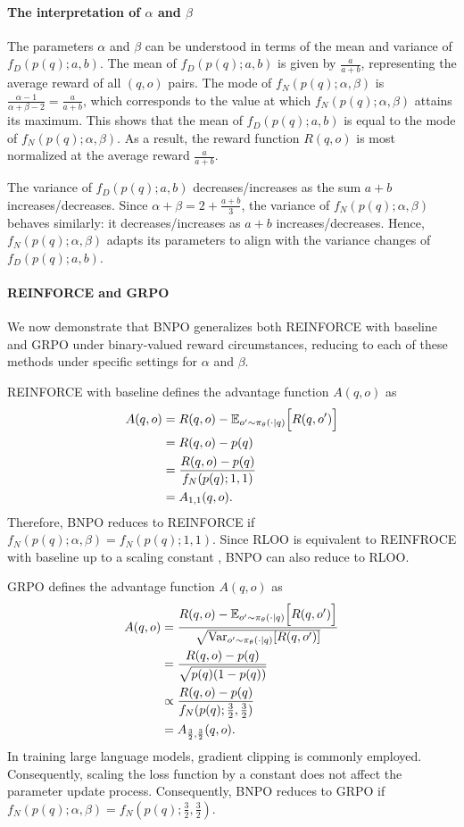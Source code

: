 \documentclass{article}
\theoremstyle{plain}
\theoremstyle{definition}
\theoremstyle{remark}
\begin{document}
\paragraph{The interpretation of $\alpha$ and $\beta$}
The parameters $\alpha$ and $\beta$ can be understood in terms of the mean and variance of $f_{D}(p(q);a,b)$. The mean of $f_{D}(p(q);a,b)$ is given by $\frac{a}{a + b}$, representing the average reward of all $(q,o)$ pairs. The mode of $f_{N}(p(q);\alpha,\beta)$ is $\frac{\alpha - 1}{\alpha + \beta - 2} = \frac{a}{a + b}$, which corresponds to the value at which $f_{N}(p(q);\alpha,\beta)$ attains its maximum. This shows that the mean of $f_{D}(p(q);a,b)$ is equal to the mode of $f_{N}(p(q);\alpha,\beta)$. As a result, the reward function $R(q, o)$ is most normalized at the average reward $\frac{a}{a + b}$.

The variance of $f_{D}(p(q);a,b)$ decreases/increases as the sum $a+b$ increases/decreases. Since $\alpha + \beta = 2 + \frac{a + b}{3}$, the variance of $f_{N}(p(q);\alpha,\beta)$ behaves similarly: it decreases/increases as $a + b$ increases/decreases. Hence, $f_{N}(p(q);\alpha,\beta)$ adapts its parameters to align with the variance changes of $f_{D}(p(q);a,b)$.

\paragraph{REINFORCE and GRPO}
We now demonstrate that BNPO generalizes both REINFORCE with baseline and GRPO under binary-valued reward circumstances, reducing to each of these methods under specific settings for $\alpha$ and $\beta$.

REINFORCE with baseline defines the advantage function $A(q,o)$ as
\begin{align}
A(q,o)&= R(q,o)-\mathbb{E}_{o'\sim\pi_\theta(\cdot| q)}\Bigl[ R(q,o') \Bigr]\notag\\
&=R(q,o)-p(q)\notag\\
&=\frac{R(q,o)-p(q)}{f_{N}(p(q);1,1)}\notag\\
&=A_{1, 1}(q,o).
\end{align}
Therefore, BNPO reduces to REINFORCE if $f_{N}(p(q);\alpha,\beta)=f_{N}(p(q);1,1)$. Since RLOO \citep{kool2019buy,ahmadian2024back} is equivalent to REINFROCE with baseline up to a scaling constant \citep{liu2025understanding}, BNPO can also reduce to RLOO.

GRPO defines the advantage function $A(q,o)$ as
\begin{align}
    A(q,o)&= \frac{R(q,o)-\mathbb{E}_{o'\sim\pi_\theta(\cdot| q)}\Bigl[ R(q,o') \Bigr]}{\sqrt{\mathrm{Var}_{o'\sim\pi_\theta(\cdot| q)}[R(q,o')]}}\notag\\
    &=\frac{R(q,o)-p(q)}{\sqrt{p(q)(1-p(q))}}\notag\\
    &\propto \frac{R(q,o)-p(q)}{f_{N}(p(q);\frac{3}{2},\frac{3}{2})}\notag\\
    &=A_{\frac{3}{2},\frac{3}{2}}(q,o).
\end{align}
In training large language models, gradient clipping is commonly employed. Consequently, scaling the loss function by a constant does not affect the parameter update process. Consequently, BNPO reduces to GRPO if $f_{N}(p(q);\alpha,\beta)=f_{N}(p(q);\frac{3}{2},\frac{3}{2})$.
\end{document}
